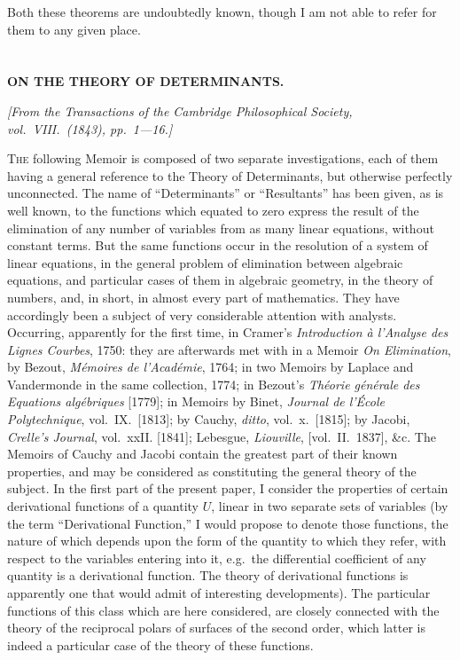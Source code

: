 \documentclass[11pt,a4paper]{book}
\begin{document}
Both these theorems are undoubtedly known, though I am not able to refer for
them to any given place.

\newpage
\setcounter{section}{11}


\section{}
\begin{center}
\textbf{ON THE THEORY OF DETERMINANTS.}
\end{center}
\textit{[From the Transactions of the Cambridge Philosophical Society, vol.\ VIII.\ (1843), pp.\ 1---16.]}

\textsc{The} following Memoir is composed of two separate investigations, each of them
having a general reference to the Theory of Determinants, but otherwise perfectly
unconnected. The name of ``Determinants'' or ``Resultants'' has been given, as is well
known, to the functions which equated to zero express the result of the elimination
of any number of variables from as many linear equations, without constant terms.
But the same functions occur in the resolution of a system of linear equations, in the
general problem of elimination between algebraic equations, and particular cases of them
in algebraic geometry, in the theory of numbers, and, in short, in almost every part
of mathematics. They have accordingly been a subject of very considerable attention
with analysts. Occurring, apparently for the first time, in Cramer's \textit{Introduction \`{a}
l'Analyse des Lignes Courbes}, 1750: they are afterwards met with in a Memoir \textit{On
Elimination}, by Bezout, \textit{M\'{e}moires de l'Acad\'{e}mie}, 1764; in two Memoirs by Laplace
and Vandermonde in the same collection, 1774; in Bezout's \textit{Th\'{e}orie g\'{e}n\'{e}rale des
Equations alg\'{e}briques} [1779]; in Memoirs by Binet, \textit{Journal de l'\'{E}cole Polytechnique},
vol.~IX.\ [1813]; by Cauchy, \textit{ditto}, vol.~x.\ [1815]; by Jacobi, \textit{Crelle's Journal}, vol.~xxII.
[1841]; Lebesgue, \textit{Liouville}, [vol.~II.\ 1837], \&c. The Memoirs of Cauchy and Jacobi
contain the greatest part of their known properties, and may be considered as constituting
the general theory of the subject. In the first part of the present paper, I consider
the properties of certain derivational functions of a quantity $U$, linear in two separate
sets of variables (by the term ``Derivational Function,'' I would propose to denote
those functions, the nature of which depends upon the form of the quantity to which
they refer, with respect to the variables entering into it, e.g.\ the differential coefficient
of any quantity is a derivational function. The theory of derivational functions is
apparently one that would admit of interesting developments). The particular functions
of this class which are here considered, are closely connected with the theory of the
reciprocal polars of surfaces of the second order, which latter is indeed a particular case
of the theory of these functions.
\end{document}
